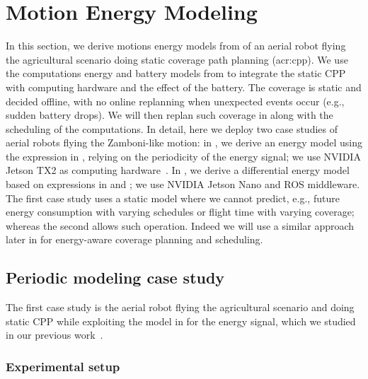\section{Motion Energy Modeling}
\label{sec:res-ene-mot}

In this section, we derive motions energy models from  of an aerial robot flying the agricultural scenario doing static coverage path planning (\Gls{acr:cpp}). We use the computations energy and battery models from  to integrate the static CPP with computing hardware and the effect of the battery. The coverage is static and decided offline, with no online replanning when unexpected events occur (e.g., sudden battery drops). We will then replan such coverage in  along with the scheduling of the computations. In detail, here we deploy two case studies of aerial robots flying the Zamboni-like motion: in , we derive an energy model using the expression in , relying on the periodicity of the energy signal; we use NVIDIA Jetson TX2 as computing hardware~\citep{seewald2020mechanical}. In , we derive a differential energy model based on expressions in  and ; we use NVIDIA Jetson Nano and ROS middleware. The first case study uses a static model where we cannot predict, e.g., future energy consumption with varying schedules or flight time with varying coverage; whereas the second allows such operation. Indeed we will use a similar approach later in  for energy-aware coverage planning and scheduling.

\subsection{Periodic modeling case study}
\label{sec:res-perio}

The first case study is the aerial robot flying the agricultural scenario and doing static CPP while exploiting the model in  for the energy signal, which we studied in our previous work~\citep{seewald2020mechanical}. 

\subsubsection*{Experimental setup}

